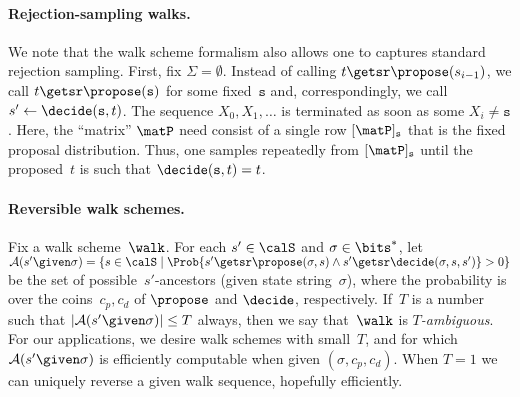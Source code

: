 \paragraph{Rejection-sampling walks. }  We note that the walk scheme
formalism also allows one to captures standard rejection sampling.  First, fix
$\Sigma=\emptyset$.
Instead of calling $t\getsr\propose(s_{i-1})$, we call
$t\getsr\propose(\mathtt{s})$ for some fixed~$\mathtt{s}$ and,
correspondingly, we call $s' \gets \decide(\mathtt{s},t)$.  The sequence
$X_0,X_1,\ldots$ is terminated as soon as some $X_i \neq \mathtt{s}$.
Here, the ``matrix'' $\matP$ need consist of a single row
$[\matP]_\mathtt{s}$ that is the fixed proposal distribution.  Thus,
one samples repeatedly from $[\matP]_{\mathtt{s}}$ until the
proposed~$t$ is such that $\decide(\mathtt{s},t)=t$. 

\paragraph{Reversible walk schemes. } Fix a walk scheme~$\walk$.  For
each $s' \in \calS$ and $\sigma \in \bits^*$, 
let $\mathcal{A}(s' \given \sigma)=\{s \in
  \calS \;|\; \Prob{s'\getsr\propose(\sigma,s) \wedge s'\getsr\decide(\sigma,s,s')}>0\}$ be the set
  of possible~$s'$-ancestors (given state string~$\sigma$), where the probability is over the
  coins~$c_p, c_d$ of $\propose$ and $\decide$, respectively.  
If~$T$ is a number such that $|\mathcal{A}(s' \given \sigma)| \leq T$ always, 
then we say that~$\walk$ is \textit{$T$-ambiguous}. 
For our applications, we desire walk schemes with small~$T$,
and for which~$\mathcal{A}(s' \given \sigma)$ is efficiently
computable when given $(\sigma,c_p,c_d)$.  When $T=1$ we can 
uniquely reverse a given walk sequence, hopefully efficiently. 

